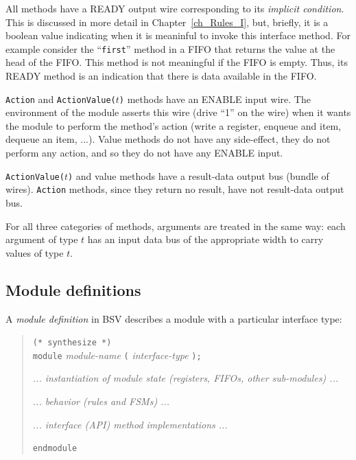 All methods have a READY output wire corresponding to its
\emph{implicit condition}.  This is discussed in more detail in
Chapter~\ref{ch_Rules_I}, but, briefly, it is a boolean value
indicating when it is meaninful to invoke this interface method.  For
example consider the ``\verb|first|'' method in a FIFO that returns
the value at the head of the FIFO.  This method is not meaningful if
the FIFO is empty.  Thus, its READY method is an indication that there
is data available in the FIFO.

{\tt Action} and {\tt ActionValue($t$)} methods have an ENABLE input
wire.  The environment of the module asserts this wire (drive ``1'' on
the wire) when it wants the module to perform the method's action
(write a register, enqueue and item, dequeue an item, ...).  Value
methods do not have any side-effect, {\ie} they do not perform any
action, and so they do not have any ENABLE input.

{\tt ActionValue($t$)} and value methods have a result-data output bus
(bundle of wires).  {\tt Action} methods, since they return no result,
have not result-data output bus.

For all three categories of methods, arguments are treated in the same
way: each argument of type $t$ has an input data bus of the
appropriate width to carry values of type $t$.


\subsection{Module definitions}

\label{Sec_Module_Definitions}


A \emph{module definition} in BSV describes a module with a particular
interface type:

\begin{quote}
{\tt (* synthesize *)} \\
{\tt module} \emph{module-name} {\tt (} \emph{interface-type} {\tt );}

\hmm \emph{... instantiation of module state (registers, FIFOs, other sub-modules) ...}

\hmm \emph{... behavior (rules and FSMs) ...}

\hmm \emph{... interface (API) method implementations ...}

{\tt endmodule}
\end{quote}

